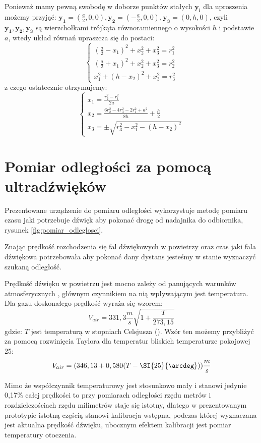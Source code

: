 Ponieważ mamy pewną swobodę w doborze punktów stałych $\boldsymbol{y_i}$ dla uproszenia możemy przyjąć:
$\boldsymbol{y_1}=(\frac{a}{2},0,0), \boldsymbol{y_2}=(-\frac{a}{2},0,0), \boldsymbol{y_3}=(0,h,0)$, czyli $\boldsymbol{y_1}, \boldsymbol{y_2}, \boldsymbol{y_3}$ są wierzchołkami
trójkąta równoramiennego o wysokości $h$ i podstawie $a$, wtedy układ równań upraszcza
się do postaci:
\[
 \begin{cases}
     (\frac{a}{2}-x_1)^2 + x_2^2 + x_3^2 = r_1^2
 \\  (\frac{a}{2}+x_1)^2 + x_2^2 + x_3^2 = r_2^2
 \\  x_1^2 + (h-x_2)^2 + x_3^2 = r_3^2
 \end{cases}
\]
z czego ostatecznie otrzymujemy:
\[
 \begin{cases}
     x_1 = \frac{r_2^2 - r_1^2}{2a}
 \\  x_2 = \frac{6r_2^2 - 4r_3^2 - 2r_1^2 + a^2}{8h}  + \frac{h}{2}
 \\  x_3 = \pm \sqrt{r_3^2-x_1^2-(h-x_2)^2}
 \end{cases}
\]






\section{Pomiar odległości za pomocą ultradźwięków}

Prezentowane urządzenie do pomiaru odległości wykorzystuje metodę pomiaru czasu jaki 
potrzebuje dźwięk aby pokonać drogę od nadajnika do odbiornika,
rysunek \ref{fig:pomiar_odleglosci}.

Znając prędkość rozchodzenia się fal dźwiękowych w powietrzy oraz czas jaki fala dźwiękowa potrzebowała
aby pokonać dany dystans jesteśmy w stanie wyznaczyć szukaną odległość.

Prędkość dźwięku w powietrzu jest mocno zależy od panujących warunków atmosferycznych \cite{bib:soundSpeed},  
głównym czynnikiem na nią wpływającym jest temperatura.
Dla gazu doskonałego prędkość wyraża się wzorem:
\[
V_{air} = 331,3  \frac{m}{s}  \sqrt{1+\frac{T}{273,15}}
\]
gdzie: $T$ jest temperaturą w stopniach Celsjusza (\SI{}{\degC}).
Wzór ten możemy przybliżyć za pomocą rozwinięcia Taylora dla temperatur bliskich temperaturze pokojowej \SI{25}{\degC}:
\[
 V_{air} = (346,13  +  0,580(T - \SI{25}{\arcdeg})) \frac{m}{s}
\]

Mimo że współczynnik temperaturowy jest stosunkowo mały i stanowi jedynie 0,17\% całej prędkości
to przy pomiarach odległości rzędu metrów i rozdzielczościach rzędu milimetrów staje się istotny, 
dlatego w prezentowanym prototypie istotną częścią stanowi kalibracja wstępna, podczas której
wyznaczana jest aktualna prędkość dźwięku, ubocznym efektem kalibracji jest pomiar temperatury otoczenia.





